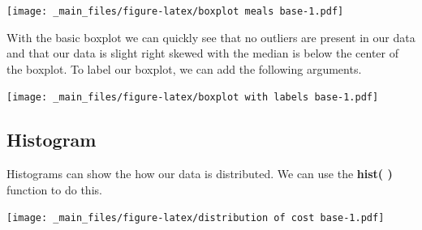 \documentclass[
]{book}
\newenvironment{Shaded}{\begin{snugshade}}{\end{snugshade}}
\newcommand{\AttributeTok}[1]{\textcolor[rgb]{0.77,0.63,0.00}{#1}}
\newcommand{\CommentTok}[1]{\textcolor[rgb]{0.56,0.35,0.01}{\textit{#1}}}
\newcommand{\DecValTok}[1]{\textcolor[rgb]{0.00,0.00,0.81}{#1}}
\newcommand{\FunctionTok}[1]{\textcolor[rgb]{0.00,0.00,0.00}{#1}}
\newcommand{\NormalTok}[1]{#1}
\newcommand{\SpecialCharTok}[1]{\textcolor[rgb]{0.00,0.00,0.00}{#1}}
\newcommand{\StringTok}[1]{\textcolor[rgb]{0.31,0.60,0.02}{#1}}
\begin{document}
\texttt{[image: \_main\_files/figure-latex/boxplot meals base-1.pdf]}

With the basic boxplot we can quickly see that no outliers are present in our data and that our data is slight right skewed with the median is below the center of the boxplot. To label our boxplot, we can add the following arguments.

\begin{Shaded}
\end{Shaded}

\texttt{[image: \_main\_files/figure-latex/boxplot with labels base-1.pdf]}

\hypertarget{histogram}{%
\subsection{Histogram}\label{histogram}}

Histograms can show the how our data is distributed. We can use the \textbf{hist( )} function to do this.

\begin{Shaded}
\end{Shaded}

\texttt{[image: \_main\_files/figure-latex/distribution of cost base-1.pdf]}
\end{document}
